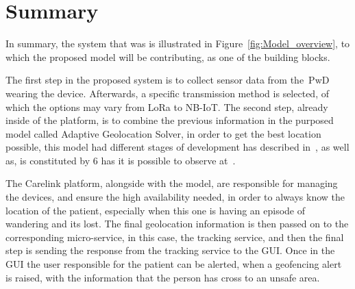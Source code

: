  
 
 
 
 
 
 
 
 
 
 
 
 
 

 
 
 
 
 
 
 
\newpage
\section{Summary}
\label{summary}
In summary, the system that was is illustrated in Figure~\ref{fig:Model_overview}, to which the proposed model will be contributing, as one of the building blocks. 

The first step in the proposed system is to collect sensor data from the~\gls{PwD} wearing the device. Afterwards, a specific transmission method is selected, of which the options may vary from LoRa to NB-IoT.
The second step, already inside of the platform, is to combine the previous information in the purposed model called Adaptive Geolocation Solver, in order to get the best location possible, this model had different stages of development has described in~, as well as, is constituted by 6 has it is possible to observe at~. 

The Carelink platform, alongside with the model, are responsible for managing the devices, and ensure the high availability needed, in order to always know the location of the patient, especially when this one is having an episode of wandering and its lost. 
The final geolocation information is then passed on to the corresponding micro-service, in this case, the tracking service, and then the final step is sending the response from the tracking service to the GUI.
Once in the GUI the user responsible for the patient can be alerted,  when a geofencing alert is raised, with the information that the person has cross to an unsafe area.

